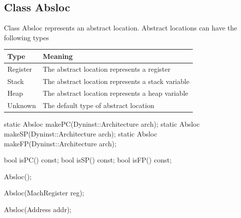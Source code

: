 \subsection{Class Absloc}
\label{sec:abslocs}


Class Absloc represents an abstract location. Abstract locations can have the
following types

\begin{center}
\begin{tabular}{ll}
\toprule
Type & Meaning \\
\midrule
Register &  The abstract location represents a register \\
Stack & The abstract location represents a stack variable \\
Heap  & The abstract location represents a heap variable \\
Unknown & The default type of abstract location \\
\bottomrule
\end{tabular}
\end{center}


\begin{apient}
static Absloc makePC(Dyninst::Architecture arch);
static Absloc makeSP(Dyninst::Architecture arch);
static Absloc makeFP(Dyninst::Architecture arch);
\end{apient}

\begin{apient}
bool isPC() const;
bool isSP() const;
bool isFP() const;
\end{apient}

\begin{apient}
Absloc();
\end{apient}

\begin{apient}
Absloc(MachRegister reg);
\end{apient}

\begin{apient}
Absloc(Address addr);
\end{apient}


